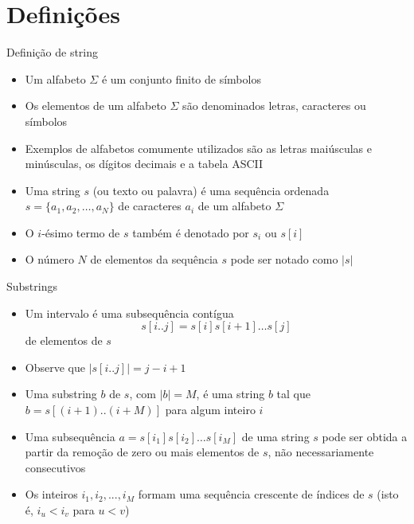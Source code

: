 \section{Definições}

\begin{frame}[fragile]{Definição de string}

    \begin{itemize}
        \item Um alfabeto $\Sigma$ é um conjunto finito de símbolos
        \pause

        \item Os elementos de um alfabeto $\Sigma$ são denominados letras, caracteres ou símbolos
        \pause

        \item Exemplos de alfabetos comumente utilizados são as letras maiúsculas e minúsculas, 
            os dígitos decimais e a tabela ASCII
        \pause

        \item Uma string $s$ (ou texto ou palavra) é uma sequência ordenada $s = \lbrace a_1, a_2, 
        \ldots, a_N\rbrace$ de caracteres $a_i$ de um alfabeto $\Sigma$
        \pause

        \item O $i$-ésimo termo de $s$ também é denotado por $s_i$ ou $s[i]$
        \pause

        \item O número $N$ de elementos da sequência $s$ pode ser notado como $|s|$

    \end{itemize}

\end{frame}

\begin{frame}[fragile]{Substrings}

    \begin{itemize}
        \item Um intervalo é uma subsequência contígua 
        \[
            s[i..j] = s[i]s[i+1]\ldots s[j]
        \] de elementos de $s$
        \pause

        \item Observe que $|s[i..j]| = j - i + 1$ 
        \pause

        \item Uma substring $b$ de $s$, com $|b| = M$, é uma string $b$ tal que $b = s[(i+1)..(i+M)]$ 
            para algum inteiro $i$
        \pause

        \item Uma subsequência $a = s[i_1]s[i_2]\ldots s[i_M]$ de uma string $s$ pode ser obtida a 
            partir da remoção de zero ou mais elementos de $s$, não necessariamente consecutivos
        \pause

        \item Os inteiros $i_1, i_2, ..., i_M$ formam uma sequência crescente de índices de $s$ 
            (isto é, $i_u < i_v$ para $u < v$)
    \end{itemize}

\end{frame}



